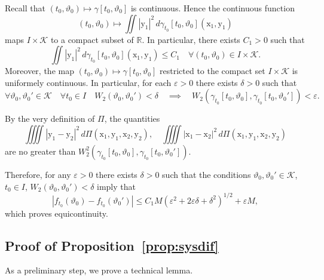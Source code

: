 \documentclass[sn-mathphys-num]{sn-jnl}
\numberwithin{equation}{section}
\theoremstyle{mythm}
\theoremstyle{mydef}
\renewcommand{\epsilon}{\varepsilon}
\renewcommand{\d}{\,d}
\begin{document}
  Recall that \( (t_0,\vartheta_0)\mapsto \gamma[t_0,\vartheta_0] \) is continuous. Hence the continuous function 
  \[
    (t_0,\vartheta_0)\mapsto \iint \left|\mathrm{y}_1\right|^2\d \gamma_{t_0}[t_0,\vartheta_0](\mathrm{x}_1,\mathrm{y}_1)
  \]
  maps \( I \times \mathcal{K} \) to a compact subset of \( \mathbb{R} \). 
  In particular, there exists \( C_1>0 \) such that 
\[
  \iint \left|\mathrm{y}_1\right|^2\d \gamma_{t_0}[t_0,\vartheta_0](\mathrm{x}_1,\mathrm{y}_1) \le C_1 \quad \forall (t_0,\vartheta_0)\in I \times \mathcal{K}.
\] 
Moreover, the map  \( (t_0,\vartheta_0)\mapsto \gamma[t_0,\vartheta_0] \) restricted to the compact set \( I \times \mathcal{K} \) is uniformely continuous.
In particular, for each \( \epsilon>0 \) there exists \( \delta>0 \) such that
\[
\forall \vartheta_0,\vartheta_0'\in \mathcal{K} \quad \forall t_0\in I \quad
  W_2(\vartheta_0,\vartheta_0')< \delta \quad\implies \quad W_2\left(\gamma_{t_0}[t_0,\vartheta_0], \gamma_{t_0}[t_0,\vartheta_0']\right)<\epsilon.
\]


By the very definition of \( \Pi \), the quantities 
\[
  \iiiint |\mathrm{y}_1- \mathrm{y}_2|^2\d \Pi(\mathrm{x}_1,\mathrm{y}_1,\mathrm{x}_2,\mathrm{y}_2), \quad 
  \iiiint |\mathrm{x}_1- \mathrm{x}_2|^2\d \Pi(\mathrm{x}_1,\mathrm{y}_1,\mathrm{x}_2,\mathrm{y}_2) 
\]
are no greater than \(  W_2^2 \left(\gamma_{t_0}[t_0,\vartheta_0], \gamma_{t_0}[t_0,\vartheta_0']\right)\).

Therefore, for any \( \epsilon>0 \) there exists \( \delta>0 \) such that the conditions \(\vartheta_0,\vartheta_0'\in \mathcal{K}\), \(t_0\in I\),
  \(W_2(\vartheta_0,\vartheta_0')< \delta\) imply that 
\[
  \left|f_{t_0}(\vartheta_0) - f_{t_0}(\vartheta_0')\right|\le C_1 M (\epsilon^2+2 \epsilon \delta +\delta^2)^{1/2} + \epsilon M,
\]
which proves equicontinuity.


\subsection{Proof of Proposition~\ref{prop:sysdif}}

As a preliminary step, we prove a technical lemma. 
\end{document}

